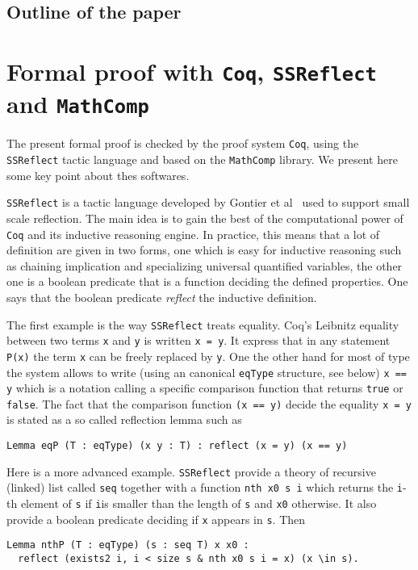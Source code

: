 \documentclass[12pt]{article}
\let\verb=\lstinline
\newcommand{\Coq}{\texttt{Coq}\xspace}
\newcommand{\SSR}{\texttt{SSReflect}\xspace}
\newcommand{\MC}{\texttt{MathComp}\xspace}
\begin{document}
\subsection{Outline of the paper}


\section{Formal proof with \Coq, \SSR and \MC}


The present formal proof is checked by the proof system \Coq, using the \SSR
tactic language and based on the \MC library. We present here some key point
about thes softwares.

\SSR is a tactic language developed by Gontier et al~\cite{SSR} used to
support small scale reflection. The main idea is to gain the best of the
computational power of \Coq and its inductive reasoning engine. In practice,
this means that a lot of definition are given in two forms, one which is easy
for inductive reasoning such as chaining implication and specializing
universal quantified variables, the other one is a boolean predicate that is a
function deciding the defined properties. One says that the boolean predicate
\emph{reflect} the inductive definition.

The first example is the way \SSR treats equality. Coq's Leibnitz equality
between two terms \verb|x| and \verb|y| is written \verb|x = y|. It express
that in any statement \verb|P(x)| the term \verb|x| can be freely replaced by
\verb|y|. One the other hand for most of type the system allows to write
(using an canonical \verb+eqType+ structure, see below) \verb|x == y| which is
a notation calling a specific comparison function that returns \verb|true| or
\verb|false|. The fact that the comparison function \verb|(x == y)| decide the
equality \verb|x = y| is stated as a so called reflection lemma such as
\begin{lstlisting}
Lemma eqP (T : eqType) (x y : T) : reflect (x = y) (x == y)
\end{lstlisting}

Here is a more advanced example. \SSR provide a theory of recursive (linked)
list called \verb+seq+ together with a function \verb+nth x0 s i+ which
returns the \verb+i+-th element of \verb+s+ if \verb+i+is smaller than the
length of \verb+s+ and \verb+x0+ otherwise. It also provide a boolean
predicate deciding if \verb+x+ appears in \verb+s+. Then
\begin{lstlisting}
Lemma nthP (T : eqType) (s : seq T) x x0 :
  reflect (exists2 i, i < size s & nth x0 s i = x) (x \in s).
\end{lstlisting}
\end{document}
